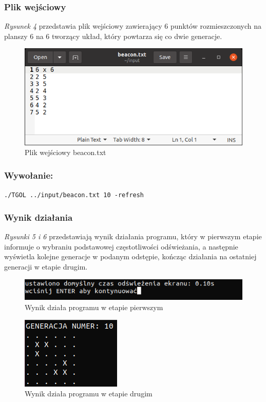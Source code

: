 \documentclass[11pt,a4paper]{report}
\begin{document}
\begin {itemize}
\subsubsection {Plik wejściowy}
\textsl{Rysunek 4} przedstawia plik wejściowy zawierający 6 punktów rozmieszczonych na planszy 6 na 6 tworzący układ, który powtarza się co dwie generacje.
\begin{figure}[!ht]
\centerline{\includegraphics{img/input_beacon.png}}
\caption{Plik wejściowy beacon.txt}
\end{figure}
\newpage
\subsubsection {Wywołanie:}
\texttt{./TGOL ../input/beacon.txt 10 -refresh}
\subsubsection {Wynik działania}
\textsl{Rysunki 5 i 6} przedstawiają wynik działania programu, który w pierwszym etapie informuje o wybraniu podstawowej częstotliwości odświeżania, a następnie wyświetla kolejne generacje w podanym odstępie, kończąc działania na ostatniej generacji w etapie drugim.
\begin{figure}[!ht]
\centerline{\includegraphics{img/output_beacon1.png}}
\caption{Wynik działa programu w etapie pierwszym}
\end{figure}
\begin{figure}[!ht]
\centerline{\includegraphics{img/output_beacon2.png}}
\caption{Wynik działa programu w etapie drugim}
\end{figure}


\end{itemize}
\end{document}
